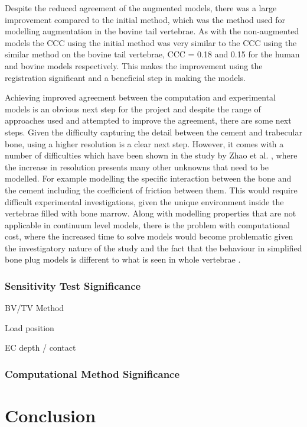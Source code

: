 Despite the reduced agreement of the augmented models, there was a large improvement compared to the initial method, which was the method used for modelling augmentation in the bovine tail vertebrae.
As with the non-augmented models the CCC using the initial method was very similar to the CCC using the similar method on the bovine tail vertebrae, CCC = 0.18 and 0.15 for the human and bovine models respectively.
This makes the improvement using the registration significant and a beneficial step in making the models.

Achieving improved agreement between the computation and experimental models is an obvious next step for the project and despite the range of approaches used and attempted to improve the agreement, there are some next steps.
Given the difficulty capturing the detail between the cement and trabecular bone, using a higher resolution is a clear next step.
However, it comes with a number of difficulties which have been shown in the study by Zhao et al. \cite{Zhao2012}, where the increase in resolution presents many other unknowns that need to be modelled.
For example modelling the specific interaction between the bone and the cement including the  coefficient of friction between them.
This would require difficult experimental investigations, given the unique environment inside the vertebrae filled with bone marrow.
Along with modelling properties that are not applicable in continuum level models, there is the problem with computational cost, where the increased time to solve models would become problematic given the investigatory nature of the study and the fact that the behaviour in simplified bone plug models is different to what is seen in whole vertebrae \cite{Sikora2013}.

\subsubsection{Sensitivity Test Significance}

BV/TV Method

Load position

EC depth / contact

\subsubsection{Computational Method Significance}

\section{Conclusion}







